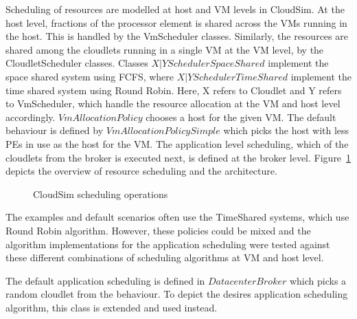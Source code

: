 \documentclass[times, 10pt,twocolumn]{article}
\begin{document}
Scheduling of resources are modelled at host and VM levels in CloudSim. At the host level, fractions of the processor element is shared across the VMs running in the host. This is handled by the VmScheduler classes. Similarly, the resources are shared among the cloudlets running in a single VM at the VM level, by the CloudletScheduler classes. Classes ${X|Y}SchedulerSpaceShared$ implement the space shared system using FCFS, where ${X|Y}SchedulerTimeShared$ implement the time shared system using Round Robin. Here, X refers to Cloudlet and Y refers to VmScheduler, which handle the resource allocation at the VM and host level accordingly. $VmAllocationPolicy$ chooses a host for the given VM. The default behaviour is defined by $VmAllocationPolicySimple$ which picks the host with less PEs in use as the host for the VM. The application level scheduling, which of the cloudlets from the broker is executed next, is defined at the broker level. Figure~\ref{fig:scheduling} depicts the overview of resource scheduling and the architecture.
\begin{figure}[ht]
 \caption{CloudSim scheduling operations}
 \label{fig:scheduling}
\end{figure}

The examples and default scenarios often use the TimeShared systems, which use Round Robin algorithm. However, these policies could be mixed and the algorithm implementations for the application scheduling were tested against these different combinations of scheduling algorithms at VM and host level.

The default application scheduling is defined in $DatacenterBroker$ which picks a random cloudlet from the behaviour. To depict the desires application scheduling algorithm, this class is extended and used instead.
\end{document}
